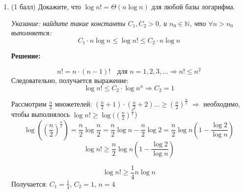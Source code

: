 \documentclass[11pt,russian]{amsart}
\newcommand{\N}{\mathbb{N}}
\newcommand{\1}{\mathbb{1}}
\begin{document}
\begin{enumerate}[label={\arabic*.}]
		\begin{enumerate}
			\item $n^i \leq n^d \leq n^k$ по условию $\Rightarrow$ $\sum\limits_{i=0}^{d} a_i n^i \leq \sum\limits_{i=0}^{d} a_i n^k$\\
			$\sum\limits_{i=0}^{d} a_i n^k = (\sum\limits_{i=0}^{d} a_i) n^k$\\
			$\sum\limits_{i=0}^{d} a_i$ можно обозначить за $C \Rightarrow C>0$, тк $a_i > 0$ по условию\\
			Следовательно, $p(n) = O(n^k)$
			\item Рассмотрим старший коэффициент многочлена $- a_d n^d$\\
			$n^d \geq n^k$, тк $k \leq d$ по условию $\Rightarrow p(n) \geq a_d n^d \geq a_d n^k$\\
			В качестве $C$ можно обозначить $a_d$ и тк $a_i > 0$ по условию $\Rightarrow C>0$\\
			Следовательно, $p(n) = \Omega(n^k)$
			\item Тк выполняются обе оценки, то $p(n) = \Theta(n^k)$ по определению\\
		\end{enumerate}

		\item (1 балл) Докажите, что $\log n! = \Theta(n\log n)$ для любой базы логарифма.

		\textit{Указание: найдите такие константы $C_1, C_2 > 0$, и $n_0 \in \N$, что $\forall n > n_0$ выполняется:}
		$$C_1\cdot n\log n \leq \log n! \leq C_2\cdot n\log n$$
		
		\textbf{Решение:}

		\[n! = n \cdot (n-1)! \quad\text{для } n = 1,2,3,\dots \Rightarrow n! \leq n^2\]
		Следовательно, получается выражение:
		$$\log n! \leq C_2\cdot \log n^n \Rightarrow C_2 = 1$$
		
		Рассмотрим $\frac{n}{2}$ множетелей: $(\frac{n}{2} + 1) \cdot (\frac{n}{2} + 2) \dots\geq (\frac{n}{2})^\frac{n}{2}$
		$\Rightarrow$  необходимо, чтобы выполнялось $\log n! \geq \log ((\frac{n}{2})^\frac{n}{2}$)
		$$\log ((\frac{n}{2})^\frac{n}{2}) = \frac{n}{2} \log \frac{n}{2} = \frac{n}{2} \log n - \frac{n}{2} \log 2 = \frac{n}{2} \log n (1 - \frac{\log 2}{\log n})$$
		$$\log n! \geq \frac{n}{2} \log n (1 - \frac{\log 2}{\log n})$$

		$$\log n! \geq \frac{1}{4} n\log n$$
		Получается: $C_1 = \frac{1}{4}$, $C_2 = 1$, $n = 4$
	\end{enumerate}
\end{document}

